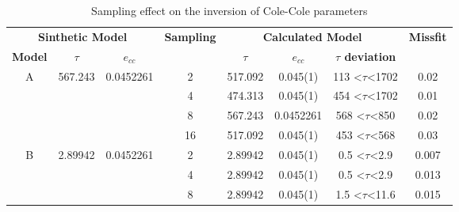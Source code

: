 \documentclass{vie16}
\begin{document}
\begin{table}[H]
\centering
\caption{Sampling effect on the inversion of Cole-Cole parameters}
\label{t:INV-sample_effect}
\begin{tabular}{@{}|c|c|c|c|c|c|c|c|@{}}
\multicolumn{3}{|c|}{\textbf{Sinthetic Model}}                             & \multirow{2}{*}{\textbf{Sampling}} & \multicolumn{3}{c|}{\textbf{Calculated Model}}                          & \multirow{2}{*}{\textbf{Missfit}}    \\
\textbf{Model}     & \textbf{$\tau$}          & \textbf{$e_{cc}$}          &                                    & \textbf{$\tau$} & \textbf{$e_{cc}$} & \textbf{$\tau$ deviation}         &                                      \\ \hline
\multirow{4}{*}{A} & \multirow{4}{*}{567.243} & \multirow{4}{*}{0.0452261} & 2                                  & 517.092         & 0.045(1)          & 113 \textless$\tau$\textless 1702 & 0.02                                 \\
                   &                          &                            & 4                                  & 474.313         & 0.045(1)          & 454 \textless$\tau$\textless 1702 & 0.01                                 \\
                   &                          &                            & 8                                  & 567.243         & 0.0452261         & 568 \textless$\tau$\textless 850  & 0.02                                 \\
                   &                          &                            & 16                                 & 517.092         & 0.045(1)          & 453 \textless$\tau$\textless 568  & 0.03                                 \\ \hline
\multirow{4}{*}{B} & \multirow{4}{*}{2.89942} & \multirow{4}{*}{0.0452261} & 2                                  & 2.89942         & 0.045(1)          & 0.5 \textless$\tau$\textless 2.9  & 0.007                                \\
                   &                          &                            & 4                                  & 2.89942         & 0.045(1)          & 0.5 \textless$\tau$\textless 2.9  & 0.013                                \\
                   &                          &                            & 8                                  & 2.89942         & 0.045(1)          & 1.5 \textless$\tau$\textless 11.6 & 0.015                                \\

\end{tabular}
\end{table}
\end{document}

